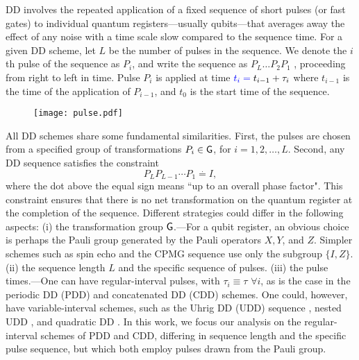 \documentclass[pra,reprint,superscriptaddress]{revtex4-2}
\begin{document}
DD involves the repeated application of a fixed sequence of short pulses (or fast gates) to individual quantum registers---usually qubits---that averages away the effect of any noise with a time scale slow compared to the sequence time. For a given DD scheme, let $L$ be the number of pulses in the sequence. We denote the $i$th pulse of the sequence as $P_i$, and write the sequence as
$P_L \ldots P_2P_1$ ,
proceeding from right to left in time. Pulse $P_i$ is applied at time ${\color{blue}{t_i={} }}t_{i-1}+\tau_i$ where $t_{i-1}$ is the time of the application of $P_{i-1}$, and $t_0$ is the start time of the sequence. 
\begin{figure}[htbp]
 \texttt{[image: pulse.pdf]}
 \caption{ }
 \label{fig:pulses}
\end{figure}

All DD schemes share some fundamental similarities. First, the pulses are chosen from a specified group of transformations $P_i \in \mathsf{G}$, for $i=1,2,\ldots, L$.
Second, any DD sequence satisfies the constraint
\begin{equation}\label{eq:fundamental-constraint}
    P_L P_{L-1} \cdots P_1 \stackrel{\textbf{.}}{=} I,
\end{equation}
where the dot above the equal sign means ``up to an overall phase factor". This constraint ensures that there is no net transformation on the quantum register at the completion of the sequence. 
Different strategies could differ in the following aspects:
(i) the transformation group $\mathsf{G}$.---For a qubit register, an obvious choice is perhaps the Pauli group generated by the Pauli operators $X,Y$, and $Z$. Simpler schemes such as spin echo \cite{Hahn1950} and the CPMG sequence \cite{Carr1954,Meiboom1958} use only the subgroup $\{I,Z\}$.  
(ii) the sequence length $L$ and the specific sequence of pulses.
(iii) the pulse times.---One can have regular-interval pulses, with $\tau_i\equiv \tau$ $\forall i$, as is the case in the periodic DD (PDD) \cite{viola1999dynamical} and concatenated DD (CDD) \cite{khodjasteh2005fault} schemes. One could, however, have variable-interval schemes, such as the Uhrig DD (UDD) sequence \cite{uhrig2007keeping}, nested UDD \cite{wang2011protection}, and quadratic DD \cite{kuo2011quadratic}.
In this work, we focus our analysis on the regular-interval schemes of PDD and CDD, differing in sequence length and the specific pulse sequence, but which both employ pulses drawn from the Pauli group. 
\end{document}
